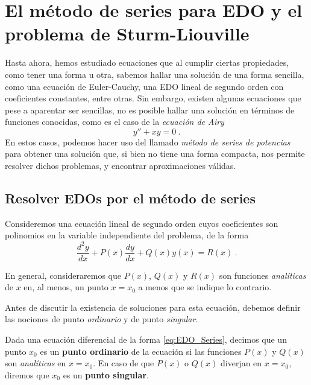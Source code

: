 \chapter{El método de series para EDO y el problema de Sturm-Liouville} \label{cap:series-sl}

Hasta ahora, hemos estudiado ecuaciones que al cumplir ciertas propiedades, como tener una forma u otra, sabemos hallar una solución de una forma sencilla, como una ecuación de Euler-Cauchy, una EDO lineal de segundo orden con coeficientes constantes, entre otras. Sin embargo, existen algunas ecuaciones que pese a aparentar ser sencillas, no es posible hallar una solución en términos de funciones conocidas, como es el caso de la \emph{ecuación de Airy}
\begin{equation}
    y'' + xy = 0 \ .
\end{equation}
En estos casos, podemos hacer uso del llamado \emph{método de series de potencias} para obtener una solución que, si bien no tiene una forma compacta, nos permite resolver dichos problemas, y encontrar aproximaciones válidas.

\section{Resolver EDOs por el método de series}

Consideremos una ecuación lineal de segundo orden cuyos coeficientes son polinomios en la variable independiente del problema, de la forma
\begin{equation} \label{eq:EDO_Series}
    \frac{d^2 y}{dx} + P(x) \frac{dy}{dx} + Q(x) y(x) = R(x) \ .
\end{equation}

En general, consideraremos que $P(x)$, $Q(x)$ y $R(x)$ son funciones \emph{analíticas} de $x$ en, al menos, un punto $x=x_0$ a menos que se indique lo contrario.

Antes de discutir la existencia de soluciones para esta ecuación, debemos definir las nociones de punto \emph{ordinario} y de punto \emph{singular}.

\begin{defi}
    Dada una ecuación diferencial de la forma \eqref{eq:EDO_Series}, decimos que un punto $x_0$ es un \textbf{punto ordinario} de la ecuación si las funciones $P(x)$ y $Q(x)$ son \emph{analíticas} en $x=x_0$. En caso de que $P(x)$ o $Q(x)$ diverjan en $x = x_0$, diremos que $x_0$ es un \textbf{punto singular}. 
\end{defi}

